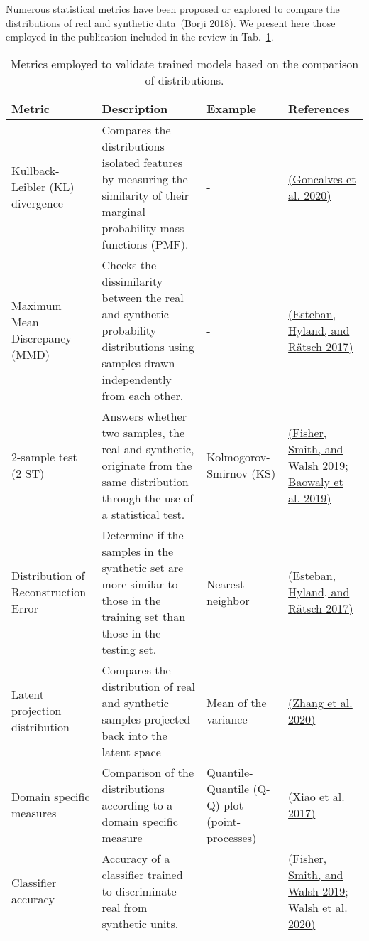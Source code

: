 \documentclass[10pt]{article}
\begin{document}
Numerous statistical metrics have been proposed or explored to compare
the distributions of real and synthetic data~\hyperref[csl:52]{(Borji 2018)}. We
present here those employed in the publication included in the review in
Tab.~{\ref{tab:evaldist}}.
\begin{table}
    \caption{{Metrics employed to validate trained models based on the comparison of distributions.\label{tab:evaldist}}} 
        
    \begin{tabular}{@{} p{} p{} p{} p{} @{}}\toprule
        
        Metric & Description & Example & References\\\midrule
        
        Kullback-Leibler (KL) divergence & Compares the distributions isolated features by measuring the similarity of their marginal probability mass functions (PMF). & - &
        \hyperref[csl:18]{(Goncalves et al. 2020)}\\
        
        Maximum Mean Discrepancy (MMD) & 
        Checks the dissimilarity between the real and synthetic probability distributions using samples drawn independently from each other. & - &
        \hyperref[csl:5]{(Esteban, Hyland, and R{\"a}tsch 2017)}\\
        
        2-sample test (2-ST) & Answers whether two samples, the real and synthetic, originate from the same distribution through the use of a statistical test. & 
        Kolmogorov-Smirnov (KS) & 
        \hyperref[csl:10]{(Fisher, Smith, and Walsh 2019}; \hyperref[csl:29]{Baowaly et al. 2019)}\\
        
        Distribution of Reconstruction Error & 
        Determine if the samples in the synthetic set are more similar to those in the training set than those in the testing set. & Nearest-neighbor &
        \hyperref[csl:5]{(Esteban, Hyland, and R{\"a}tsch 2017)}\\
        
        Latent projection distribution & 
        Compares the distribution of real and synthetic samples projected back into the latent space & Mean of the variance & \hyperref[csl:32]{(Zhang et al. 2020)}\\
        
        Domain specific measures & Comparison of the distributions according to a domain specific measure & Quantile-Quantile (Q-Q) plot (point-processes) & \hyperref[csl:4]{(Xiao et al. 2017)}\\
        
        Classifier accuracy & Accuracy of a classifier trained to discriminate real from synthetic units. & - & \hyperref[csl:10]{(Fisher, Smith, and Walsh 2019}; \hyperref[csl:12]{Walsh et al. 2020)}\\\bottomrule
        
    \end{tabular}
\end{table}
\end{document}
